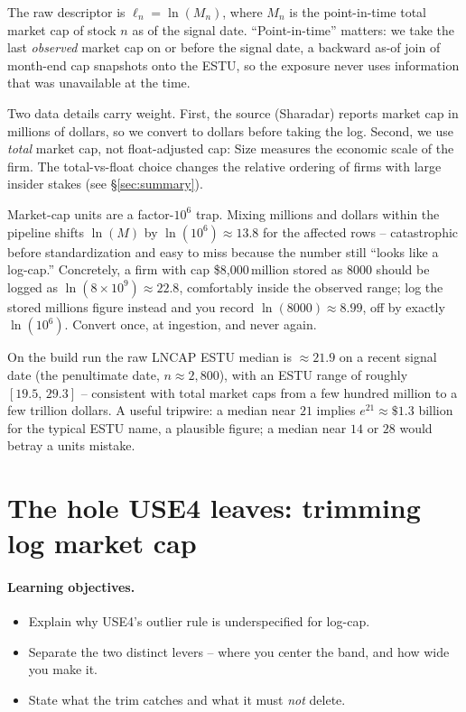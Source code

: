 \documentclass[11pt]{article}
\theoremstyle{definition}
\theoremstyle{plain}
\theoremstyle{remark}
\begin{document}
The raw descriptor is $\ell_n = \ln(M_n)$, where $M_n$ is the point-in-time total market cap of stock $n$ as of the signal date. ``Point-in-time'' matters: we take the last \emph{observed} market cap on or before the signal date, a backward as-of join of month-end cap snapshots onto the ESTU, so the exposure never uses information that was unavailable at the time.

Two data details carry weight. First, the source (Sharadar) reports market cap in millions of dollars, so we convert to dollars before taking the log. Second, we use \emph{total} market cap, not float-adjusted cap: Size measures the economic scale of the firm. The total-vs-float choice changes the relative ordering of firms with large insider stakes (see \S\ref{sec:summary}).

\begin{pitfall}
Market-cap units are a factor-$10^6$ trap. Mixing millions and dollars within the pipeline shifts $\ln(M)$ by $\ln(10^6)\approx 13.8$ for the affected rows -- catastrophic before standardization and easy to miss because the number still ``looks like a log-cap.'' Concretely, a firm with cap \$8{,}000\,million stored as $8000$ should be logged as $\ln(8\times10^9)\approx 22.8$, comfortably inside the observed range; log the stored millions figure instead and you record $\ln(8000)\approx 8.99$, off by exactly $\ln(10^6)$. Convert once, at ingestion, and never again.
\end{pitfall}

\begin{observed}
On the build run the raw LNCAP ESTU median is $\approx 21.9$ on a recent signal date (the penultimate date, $n\approx2{,}800$), with an ESTU range of roughly $[19.5,\,29.3]$ -- consistent with total market caps from a few hundred million to a few trillion dollars. A useful tripwire: a median near $21$ implies $e^{21}\approx \$1.3$ billion for the typical ESTU name, a plausible figure; a median near $14$ or $28$ would betray a units mistake.
\end{observed}

\section{The hole USE4 leaves: trimming log market cap}\label{sec:trim}

\paragraph{Learning objectives.}
\begin{itemize}[leftmargin=1.4em,topsep=2pt,itemsep=1pt]
  \item Explain why USE4's outlier rule is underspecified for log-cap.
  \item Separate the two distinct levers -- where you center the band, and how wide you make it.
  \item State what the trim catches and what it must \emph{not} delete.
\end{itemize}
\end{document}
